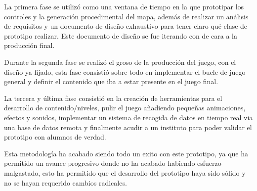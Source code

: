 La primera fase se utilizó como una ventana de tiempo en la que prototipar los controles y la generación procedimental del mapa, además de realizar un análisis de requisitos y un documento de diseño exhaustivo para tener claro qué clase de prototipo realizar. Este documento de diseño se fue iterando con \nombretutor de cara a la producción final.

Durante la segunda fase se realizó el groso de la producción del juego, con el diseño ya fijado, esta fase consistió sobre todo en implementar el bucle de juego general y definir el contenido que iba a estar presente en el juego final.

La tercera y última fase consistió en la creación de herramientas para el desarrollo de contenido/niveles, pulir el juego añadiendo pequeñas animaciones, efectos y sonidos, implementar un sistema de recogida de datos en tiempo real via una base de datos remota y finalmente acudir a un instituto para poder validar el prototipo con alumnos de verdad.

Esta metodología ha acabado siendo todo un exito con este prototipo, ya que ha permitido un avance progresivo donde no ha acabado habiendo esfuerzo malgastado, esto ha permitido que el desarrollo del prototipo haya sido sólido y no se hayan requerido cambios radicales.